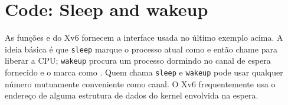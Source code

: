 \section{Code: Sleep and wakeup}
As funções
e
do Xv6 fornecem a interface usada no último exemplo acima.
A ideia básica é que
\lstinline{sleep}
marque o processo atual como
e então chame
para liberar a CPU;
\lstinline{wakeup}
procura um processo dormindo no canal de espera fornecido
e o marca como
.
Quem chama
\lstinline{sleep}
e
\lstinline{wakeup}
pode usar qualquer número mutuamente conveniente como canal.
O Xv6 frequentemente usa o endereço
de alguma estrutura de dados do kernel envolvida na espera.

